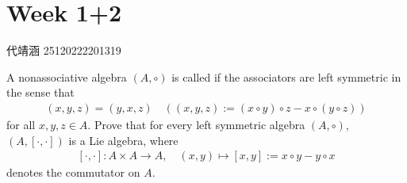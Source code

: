 \documentclass[../main.tex]{subfiles}
\begin{document}
\chapter{ Week 1+2 }

代靖涵 25120222201319

\begin{exercise}{}{}
A nonassociative algebra $(A, \circ)$ is called  if the associators are left symmetric in the sense that
\[\begin{aligned}
(x,y,z) = (y,x,z) \quad ((x,y,z) := (x \circ y) \circ z - x \circ (y \circ z))
\end{aligned}\]
for all $x,y,z \in A$. Prove that for every left symmetric algebra $(A, \circ)$, $(A, [\cdot, \cdot])$ is a Lie algebra, where
\[\begin{aligned}
[\cdot, \cdot] : A \times A \to A, \quad (x,y) \mapsto [x,y] := x \circ y - y \circ x
\end{aligned}\]
denotes the commutator on $A$.
\end{exercise}
\end{document}

